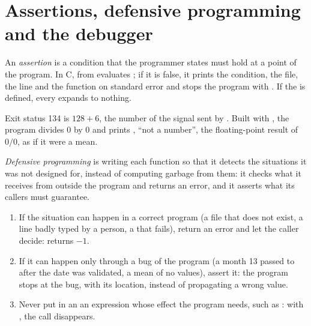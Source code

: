 \section{Assertions, defensive programming and the debugger}\label{sec:b1:c-modules-make-tests:assert}

\begin{definition}[Assertion]\label{def:b1:c-modules-make-tests:assertion}
An \emph{assertion} is a condition that the programmer states must hold at a point of the program.
In C,  from  evaluates ; if it is false, it prints the condition, the file,
the line and the function on standard error and stops the program with . If the   is
defined, every  expands to nothing.
\end{definition}

\label{lst:b1:c-modules-make-tests:assert}

\label{out:b1:c-modules-make-tests:assert}

Exit status 134 is $128 + 6$, the number of the signal sent by . Built with , the program
divides 0 by 0 and prints , ``not a number'', the floating-point result of $0/0$, as if it were a mean.

\begin{definition}\label{def:b1:c-modules-make-tests:defensive}
\emph{Defensive programming} is writing each function so that it detects the
situations it was not designed for, instead of computing garbage from them: it checks what it receives from outside
the program and returns an error, and it asserts what its callers must guarantee.
\end{definition}

\begin{method}\label{met:b1:c-modules-make-tests:assert-or-error}
\begin{enumerate}
\item If the situation can happen in a correct program (a file that does not exist, a line badly typed by a person, a
 that fails), return an error and let the caller decide:  returns $-1$.
\item If it can happen only through a bug of the program (a month 13 passed to  after the date was
validated, a mean of no values), assert it: the program stops at the bug, with its location, instead of propagating a
wrong value.
\item Never put in an  an expression whose effect the program needs, such as :
with , the call disappears.
\end{enumerate}
\end{method}

